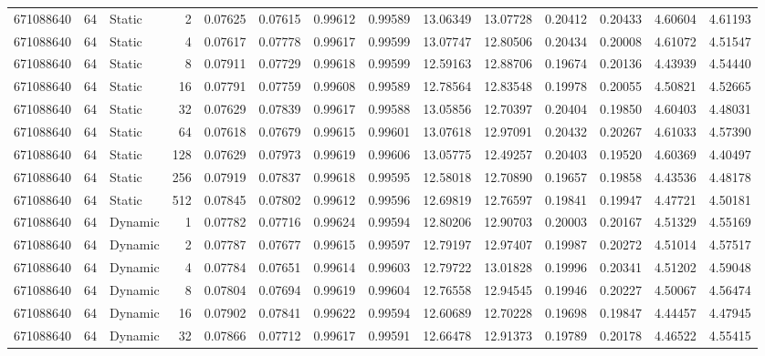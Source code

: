 \begin{tabular}{rrlrrrrrrrrrrr}
671088640 & 64 & Static & 2 & 0.07625 & 0.07615 & 0.99612 & 0.99589 & 13.06349 & 13.07728 & 0.20412 & 0.20433 & 4.60604 & 4.61193 \\
671088640 & 64 & Static & 4 & 0.07617 & 0.07778 & 0.99617 & 0.99599 & 13.07747 & 12.80506 & 0.20434 & 0.20008 & 4.61072 & 4.51547 \\
671088640 & 64 & Static & 8 & 0.07911 & 0.07729 & 0.99618 & 0.99599 & 12.59163 & 12.88706 & 0.19674 & 0.20136 & 4.43939 & 4.54440 \\
671088640 & 64 & Static & 16 & 0.07791 & 0.07759 & 0.99608 & 0.99589 & 12.78564 & 12.83548 & 0.19978 & 0.20055 & 4.50821 & 4.52665 \\
671088640 & 64 & Static & 32 & 0.07629 & 0.07839 & 0.99617 & 0.99588 & 13.05856 & 12.70397 & 0.20404 & 0.19850 & 4.60403 & 4.48031 \\
671088640 & 64 & Static & 64 & 0.07618 & 0.07679 & 0.99615 & 0.99601 & 13.07618 & 12.97091 & 0.20432 & 0.20267 & 4.61033 & 4.57390 \\
671088640 & 64 & Static & 128 & 0.07629 & 0.07973 & 0.99619 & 0.99606 & 13.05775 & 12.49257 & 0.20403 & 0.19520 & 4.60369 & 4.40497 \\
671088640 & 64 & Static & 256 & 0.07919 & 0.07837 & 0.99618 & 0.99595 & 12.58018 & 12.70890 & 0.19657 & 0.19858 & 4.43536 & 4.48178 \\
671088640 & 64 & Static & 512 & 0.07845 & 0.07802 & 0.99612 & 0.99596 & 12.69819 & 12.76597 & 0.19841 & 0.19947 & 4.47721 & 4.50181 \\
671088640 & 64 & Dynamic & 1 & 0.07782 & 0.07716 & 0.99624 & 0.99594 & 12.80206 & 12.90703 & 0.20003 & 0.20167 & 4.51329 & 4.55169 \\
671088640 & 64 & Dynamic & 2 & 0.07787 & 0.07677 & 0.99615 & 0.99597 & 12.79197 & 12.97407 & 0.19987 & 0.20272 & 4.51014 & 4.57517 \\
671088640 & 64 & Dynamic & 4 & 0.07784 & 0.07651 & 0.99614 & 0.99603 & 12.79722 & 13.01828 & 0.19996 & 0.20341 & 4.51202 & 4.59048 \\
671088640 & 64 & Dynamic & 8 & 0.07804 & 0.07694 & 0.99619 & 0.99604 & 12.76558 & 12.94545 & 0.19946 & 0.20227 & 4.50067 & 4.56474 \\
671088640 & 64 & Dynamic & 16 & 0.07902 & 0.07841 & 0.99622 & 0.99594 & 12.60689 & 12.70228 & 0.19698 & 0.19847 & 4.44457 & 4.47945 \\
671088640 & 64 & Dynamic & 32 & 0.07866 & 0.07712 & 0.99617 & 0.99591 & 12.66478 & 12.91373 & 0.19789 & 0.20178 & 4.46522 & 4.55415 \\

\end{tabular}
